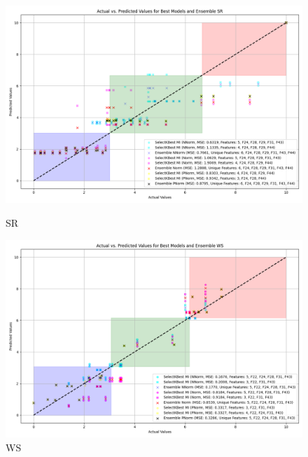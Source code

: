 \begin{figure}[H]
    \centering
    \begin{minipage}{0.45\textwidth}
        \centering
        \includegraphics[width=\linewidth]{reg_section_all/featred_ensemble_learning/actual_vs_predicted_best_feature_selection_and_ensemble_SR_10.png}
        \caption{SR}
        \label{reg_all_fig:sr_featred}
    \end{minipage}\hfill
    \begin{minipage}{0.45\textwidth}
        \centering
        \includegraphics[width=\linewidth]{reg_section_all/featred_ensemble_learning/actual_vs_predicted_best_feature_selection_and_ensemble_WS_10.png}
        \caption{WS}
        \label{reg_all_fig:ws_featred}
    \end{minipage}
\end{figure}

